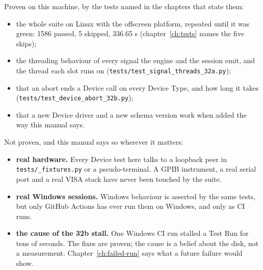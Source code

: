 Proven on this machine, by the tests named in the chapters that state them:

\begin{itemize}
  \item the whole suite on Linux with the offscreen platform, repeated until it was green: 1586
    passed, 5 skipped, 336.65 s (chapter~\ref{ch:tests} names the five skips);
  \item the threading behaviour of every signal the engine and the session emit, and the thread each
    slot runs on (\texttt{tests/\allowbreak{}test\_\allowbreak{}signal\_\allowbreak{}threads\_\allowbreak32a.py});
  \item that an abort ends a Device call on every Device Type, and how long it takes
    (\texttt{tests/\allowbreak{}test\_\allowbreak{}device\_\allowbreak{}abort\_\allowbreak32b.py});
  \item that a new Device driver and a new schema version work when added the way this manual says.
\end{itemize}

Not proven, and this manual says so wherever it matters:

\begin{itemize}
  \item \textbf{real hardware.} Every Device test here talks to a loopback peer in
    \texttt{tests/\_fixtures.py} or a pseudo-terminal. A GPIB instrument, a real serial port and a
    real VISA stack have never been touched by the suite.
  \item \textbf{real Windows sessions.} Windows behaviour is asserted by the same tests, but only
    GitHub Actions has ever run them on Windows, and only as CI runs.
  \item \textbf{the cause of the 32b stall.} One Windows CI run stalled a Test Run for tens of
    seconds. The fixes are proven; the cause is a belief about the disk, not a measurement.
    Chapter~\ref{ch:failed-run} says what a future failure would show.
\end{itemize}


